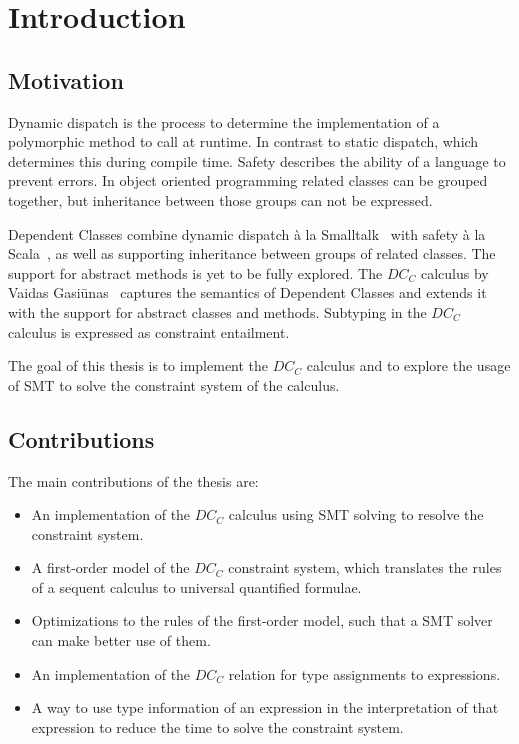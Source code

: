 \chapter{Introduction}
\section{Motivation}
Dynamic dispatch is the process to determine
the implementation of a polymorphic method
to call at runtime.
In contrast to static dispatch,
which determines this during compile time.
%
Safety describes the ability of a language
to prevent errors.
%
In object oriented programming
related classes can be grouped together,
but inheritance between those groups can not be expressed.

Dependent Classes combine dynamic dispatch à la Smalltalk~\cite{smalltalk}
with safety à la Scala~\cite{scala},
as well as supporting inheritance between groups of related classes.
The support for abstract methods is yet to be fully explored.
The $DC_C$ calculus by Vaidas Gasiūnas~\cite{vaidas:thesis}
captures the semantics of Dependent Classes
and extends it with the support for abstract classes and methods.
Subtyping in the $DC_C$ calculus is expressed as constraint entailment.

The goal of this thesis is to implement the $DC_C$ calculus
and to explore the usage of SMT to solve the constraint system of the calculus.


\section{Contributions}
The main contributions of the thesis are:
\begin{itemize}
  \item An implementation of the $DC_C$ calculus
        using SMT solving to resolve the constraint system.
  \item A first-order model of the $DC_C$ constraint system,
        which translates the rules of a sequent calculus
        to universal quantified formulae.
  \item Optimizations to the rules of the first-order model,
        such that a SMT solver can make better use of them.
  \item An implementation of the $DC_C$ relation for
        type assignments to expressions.
  \item A way to use type information of an expression
        in the interpretation of that expression
        to reduce the time to solve the constraint system.
\end{itemize}

